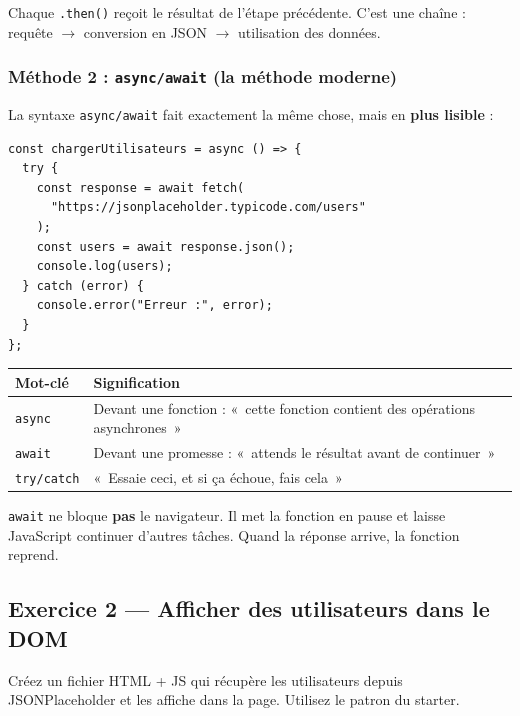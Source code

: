 \documentclass[11pt,a4paper]{article}
\begin{document}
Chaque \texttt{.then()} reçoit le résultat de l'étape précédente. C'est une chaîne : requête $\to$ conversion en JSON $\to$ utilisation des données.

\subsubsection{Méthode 2 : \texttt{async/await} (la méthode moderne)}

La syntaxe \texttt{async/await} fait exactement la même chose, mais en \textbf{plus lisible} :

\begin{lstlisting}
const chargerUtilisateurs = async () => {
  try {
    const response = await fetch(
      "https://jsonplaceholder.typicode.com/users"
    );
    const users = await response.json();
    console.log(users);
  } catch (error) {
    console.error("Erreur :", error);
  }
};
\end{lstlisting}

\begin{retenirbox}
\begin{center}
\begin{tabular}{lp{8cm}}
\toprule
\textbf{Mot-clé} & \textbf{Signification} \\
\midrule
\texttt{async} & Devant une fonction : «~cette fonction contient des opérations asynchrones~» \\
\texttt{await} & Devant une promesse : «~attends le résultat avant de continuer~» \\
\texttt{try/catch} & «~Essaie ceci, et si ça échoue, fais cela~» \\
\bottomrule
\end{tabular}
\end{center}
\texttt{await} ne bloque \textbf{pas} le navigateur. Il met la fonction en pause et laisse JavaScript continuer d'autres tâches. Quand la réponse arrive, la fonction reprend.
\end{retenirbox}

\subsection{Exercice 2 --- Afficher des utilisateurs dans le DOM}

\begin{objectifbox}
Créez un fichier HTML + JS qui récupère les utilisateurs depuis JSONPlaceholder et les affiche dans la page. Utilisez le patron du starter.
\end{objectifbox}
\end{document}
